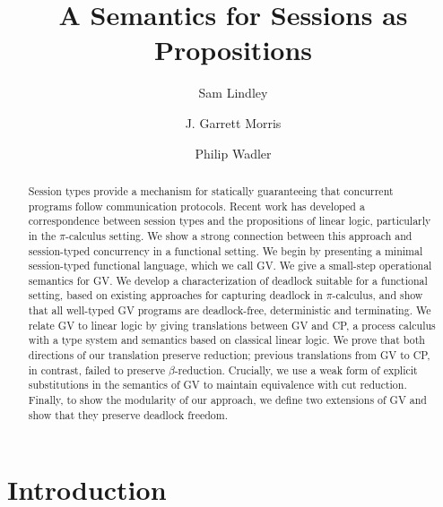 \documentclass[oribibl,orivec,envcountsame]{llncs}
\title{A Semantics for Sessions as Propositions}
\author{Sam Lindley \and J. Garrett Morris \and Philip Wadler}
\institute{The University of Edinburgh \\
           \email{\{Sam.Lindley,Garrett.Morris,Philip.Wadler\}@ed.ac.uk} \vspace{-5mm}}
\begin{document}
\maketitle



\begin{abstract}
  Session types provide a mechanism for statically guaranteeing that concurrent programs follow
  communication protocols.  Recent work has developed a correspondence between session types and the
  propositions of linear logic, particularly in the $\pi$-calculus setting.
%
  We show a strong connection between this approach and session-typed concurrency in a functional
  setting.
%
  We begin by presenting a minimal session-typed functional language, which we call GV.  We give a
  small-step operational semantics for GV.  We develop a characterization of deadlock suitable for a
  functional setting, based on existing approaches for capturing deadlock in $\pi$-calculus, and
  show that all well-typed GV programs are deadlock-free, deterministic and terminating.
%
  We relate GV to linear logic by giving translations between GV and CP, a process calculus with a
  type system and semantics based on classical linear logic.  We prove that both directions of our
  translation preserve reduction; previous translations from GV to CP, in contrast, failed to
  preserve $\beta$-reduction. Crucially, we use a weak form of explicit substitutions in the
  semantics of GV to maintain equivalence with cut reduction.
%
  Finally, to show the modularity of our approach, we define two extensions of GV and show that they
  preserve deadlock freedom.
\end{abstract}

\section{Introduction}\label{sec:intro}
\end{document}
